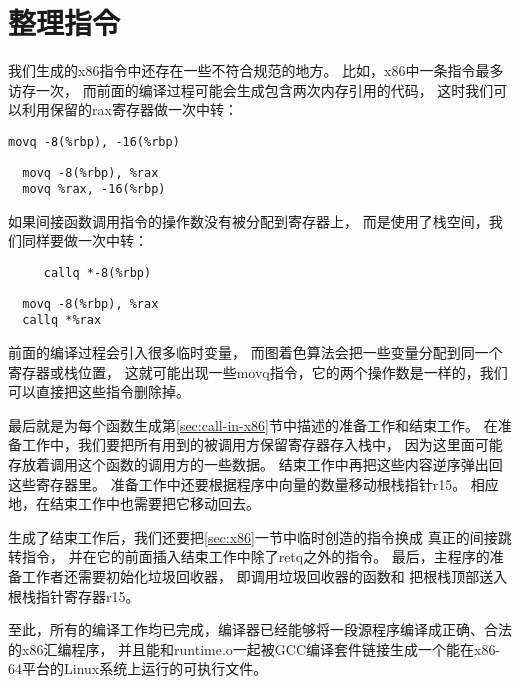 
\section{整理指令}

我们生成的x86指令中还存在一些不符合规范的地方。
比如，x86中一条指令最多访存一次，
而前面的编译过程可能会生成包含两次内存引用的代码，
这时我们可以利用保留的rax寄存器做一次中转：

\begin{transformation}
\begin{lstlisting}
movq -8(%rbp), -16(%rbp)
\end{lstlisting}
\compilesto
\begin{lstlisting}
  movq -8(%rbp), %rax
  movq %rax, -16(%rbp)
\end{lstlisting}
\end{transformation}

如果间接函数调用指令的操作数没有被分配到寄存器上，
而是使用了栈空间，我们同样要做一次中转：
\begin{transformation}
\begin{lstlisting}
     callq *-8(%rbp)
\end{lstlisting}
\compilesto
\begin{lstlisting}
  movq -8(%rbp), %rax
  callq *%rax
\end{lstlisting}
\end{transformation}

前面的编译过程会引入很多临时变量，
而图着色算法会把一些变量分配到同一个寄存器或栈位置，
这就可能出现一些movq指令，它的两个操作数是一样的，我们可以直接把这些指令删除掉。

最后就是为每个函数生成第\ref{sec:call-in-x86}节中描述的准备工作和结束工作。
在准备工作中，我们要把所有用到的被调用方保留寄存器存入栈中，
因为这里面可能存放着调用这个函数的调用方的一些数据。
结束工作中再把这些内容逆序弹出回这些寄存器里。
准备工作中还要根据程序中向量的数量移动根栈指针r15。
相应地，在结束工作中也需要把它移动回去。

生成了结束工作后，我们还要把\ref{sec:x86}一节中临时创造的指令换成
真正的间接跳转指令，
并在它的前面插入结束工作中除了retq之外的指令。
最后，主程序的准备工作者还需要初始化垃圾回收器，
即调用垃圾回收器的函数和
把根栈顶部送入根栈指针寄存器r15。

至此，所有的编译工作均已完成，编译器已经能够将一段源程序编译成正确、合法的x86汇编程序，
并且能和runtime.o一起被GCC编译套件链接生成一个能在x86-64平台的Linux系统上运行的可执行文件。
